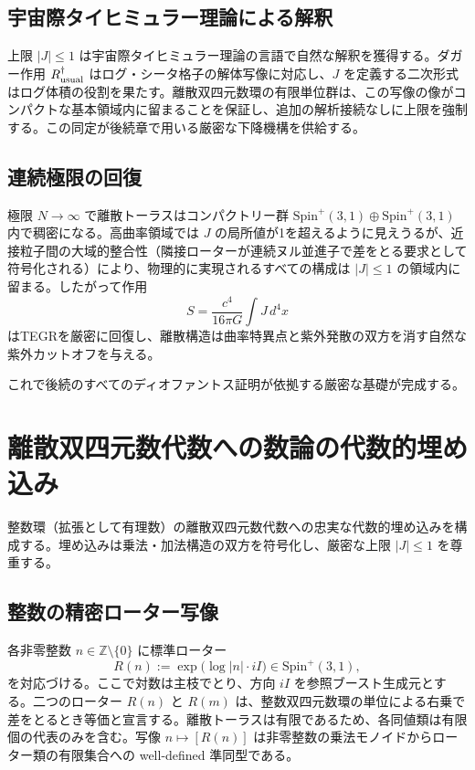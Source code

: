 \documentclass[a4paper]{article}
\theoremstyle{definition}
\begin{document}
\subsection{宇宙際タイヒミュラー理論による解釈}

上限 $|J| \leq 1$ は宇宙際タイヒミュラー理論の言語で自然な解釈を獲得する。ダガー作用 $R_{\rm usual}^\dagger$ はログ・シータ格子の解体写像に対応し、$J$ を定義する二次形式はログ体積の役割を果たす。離散双四元数環の有限単位群は、この写像の像がコンパクトな基本領域内に留まることを保証し、追加の解析接続なしに上限を強制する。この同定が後続章で用いる厳密な下降機構を供給する。

\subsection{連続極限の回復}

極限 $N \to \infty$ で離散トーラスはコンパクトリー群 $\mathrm{Spin}^+(3,1) \oplus \mathrm{Spin}^+(3,1)$ 内で稠密になる。高曲率領域では $J$ の局所値が1を超えるように見えうるが、近接粒子間の大域的整合性（隣接ローターが連続ヌル並進子で差をとる要求として符号化される）により、物理的に実現されるすべての構成は $|J| \leq 1$ の領域内に留まる。したがって作用
\[
S = \frac{c^4}{16\pi G} \int J \, d^4x
\]
はTEGRを厳密に回復し、離散構造は曲率特異点と紫外発散の双方を消す自然な紫外カットオフを与える。

これで後続のすべてのディオファントス証明が依拠する厳密な基礎が完成する。

\section{離散双四元数代数への数論の代数的埋め込み}

整数環（拡張として有理数）の離散双四元数代数への忠実な代数的埋め込みを構成する。埋め込みは乗法・加法構造の双方を符号化し、厳密な上限 $|J| \leq 1$ を尊重する。

\subsection{整数の精密ローター写像}

各非零整数 $n \in \mathbb{Z} \setminus \{0\}$ に標準ローター
\[
R(n) := \exp\bigl( \log |n| \cdot iI \bigr) \in \mathrm{Spin}^+(3,1),
\]
を対応づける。ここで対数は主枝でとり、方向 $iI$ を参照ブースト生成元とする。二つのローター $R(n)$ と $R(m)$ は、整数双四元数環の単位による右乗で差をとるとき等価と宣言する。離散トーラスは有限であるため、各同値類は有限個の代表のみを含む。写像 $n \mapsto [R(n)]$ は非零整数の乗法モノイドからローター類の有限集合への well-defined 準同型である。
\end{document}
